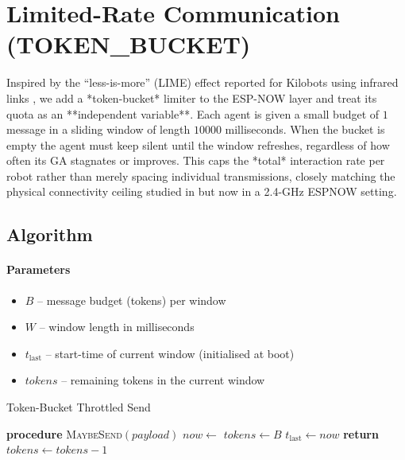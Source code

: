 \documentclass[conference]{IEEEtran}
\begin{document}

\section{Limited-Rate Communication (TOKEN\_BUCKET)}

Inspired by the “less-is-more” (LIME) effect reported for Kilobots using infrared links \cite{aust_hidden_2022}, we add a *token-bucket* limiter to the ESP-NOW layer and treat its quota as an **independent variable**.  
Each agent is given a small budget of $1$ message in a sliding window of length $10000$ milliseconds.  When the bucket is empty the agent must keep silent until the window refreshes, regardless of how often its GA stagnates or improves.  This caps the *total* interaction rate per robot rather than merely spacing individual transmissions, closely matching the physical connectivity ceiling studied in \cite{aust_hidden_2022} but now in a 2.4-GHz ESPNOW setting.

\subsection{Algorithm}

\paragraph{Parameters}
\begin{itemize}
  \item $B$ – message budget (tokens) per window
  \item $W$ – window length in milliseconds
  \item $t_{\mathrm{last}}$ – start-time of current window (initialised at boot)
  \item $\mathit{tokens}$ – remaining tokens in the current window
\end{itemize}

\begin{algorithm}[H]
\caption{Token-Bucket Throttled Send}
\label{alg:token_bucket}
\begin{algorithmic}[1]
\State \textbf{procedure} \textsc{MaybeSend}$(\mathit{payload})$
\State $now \gets$ 
               
    \State $\mathit{tokens} \gets B$
    \State $t_{\mathrm{last}} \gets now$
\EndIf
{}
    \State \textbf{return}   
\EndIf
{}
    \State $\mathit{tokens} \gets \mathit{tokens} - 1$
    \State {}
\EndIf
\end{algorithmic}
\end{algorithm}
\end{document}
